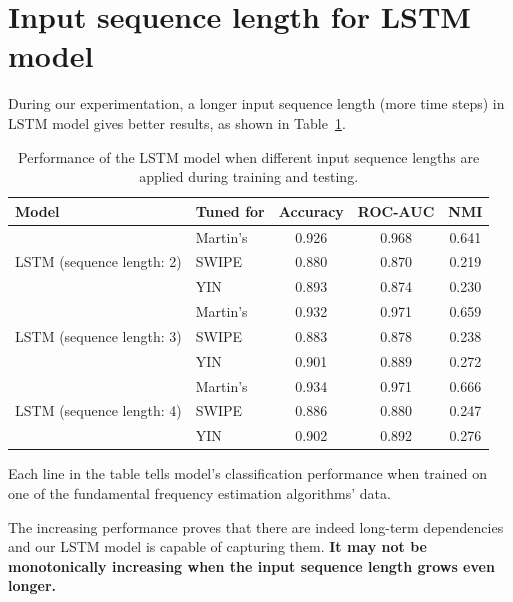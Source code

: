 \documentclass[11pt,a4paper]{report}
\begin{document}
\newpage

\section{Input sequence length for LSTM model}

During our experimentation, a longer input sequence length (more time steps) in LSTM model gives better results, as shown in Table~\ref{tab:lstm-isl}.

\begin{table}[htbp]
  \centering
  \begin{tabular}{llccc}
  	\toprule
  	Model                                      & Tuned for & Accuracy & ROC-AUC &  NMI  \\
  	\midrule
  	\multirow{3}{*}{LSTM (sequence length: 2)} & Martin's  &  0.926   &  0.968  & 0.641 \\
  	                                           & SWIPE     &  0.880   &  0.870  & 0.219 \\
  	                                           & YIN       &  0.893   &  0.874  & 0.230 \\
  	\midrule
  	\multirow{3}{*}{LSTM (sequence length: 3)} & Martin's  &  0.932   &  0.971  & 0.659 \\
  	                                           & SWIPE     &  0.883   &  0.878  & 0.238 \\
  	                                           & YIN       &  0.901   &  0.889  & 0.272 \\
  	\midrule
  	\multirow{3}{*}{LSTM (sequence length: 4)} & Martin's  &  0.934   &  0.971  & 0.666 \\
  	                                           & SWIPE     &  0.886   &  0.880  & 0.247 \\
  	                                           & YIN       &  0.902   &  0.892  & 0.276 \\
  	\bottomrule
  \end{tabular}
  \caption{Performance of the LSTM model when different input sequence lengths are applied during training and testing.} \label{tab:lstm-isl}
\end{table}

Each line in the table tells model's classification performance when trained on one of the fundamental frequency estimation algorithms' data.

\bigskip

The increasing performance proves that there are indeed long-term dependencies and our LSTM model is capable of capturing them.
\textbf{It may not be monotonically increasing when the input sequence length grows even longer.}
\end{document}

